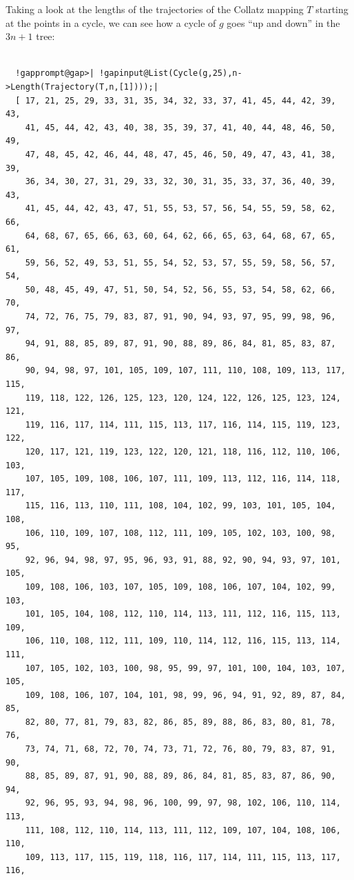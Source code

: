 \documentclass[a4paper,11pt]{report}
\begin{document}
{{\begin{Verbatim}[commandchars=!@A,fontsize=\small,frame=single,label=Example]
\end{Verbatim}
 Taking a look at the lengths of the trajectories of the Collatz mapping $T$ starting at the points in a cycle, we can see how a cycle of $g$ goes ``up and down'' in the $3n+1$ tree: 
\begin{Verbatim}[commandchars=!@|,fontsize=\small,frame=single,label=Example]
  
  !gapprompt@gap>| !gapinput@List(Cycle(g,25),n->Length(Trajectory(T,n,[1])));|
  [ 17, 21, 25, 29, 33, 31, 35, 34, 32, 33, 37, 41, 45, 44, 42, 39, 43, 
    41, 45, 44, 42, 43, 40, 38, 35, 39, 37, 41, 40, 44, 48, 46, 50, 49, 
    47, 48, 45, 42, 46, 44, 48, 47, 45, 46, 50, 49, 47, 43, 41, 38, 39, 
    36, 34, 30, 27, 31, 29, 33, 32, 30, 31, 35, 33, 37, 36, 40, 39, 43, 
    41, 45, 44, 42, 43, 47, 51, 55, 53, 57, 56, 54, 55, 59, 58, 62, 66, 
    64, 68, 67, 65, 66, 63, 60, 64, 62, 66, 65, 63, 64, 68, 67, 65, 61, 
    59, 56, 52, 49, 53, 51, 55, 54, 52, 53, 57, 55, 59, 58, 56, 57, 54, 
    50, 48, 45, 49, 47, 51, 50, 54, 52, 56, 55, 53, 54, 58, 62, 66, 70, 
    74, 72, 76, 75, 79, 83, 87, 91, 90, 94, 93, 97, 95, 99, 98, 96, 97, 
    94, 91, 88, 85, 89, 87, 91, 90, 88, 89, 86, 84, 81, 85, 83, 87, 86, 
    90, 94, 98, 97, 101, 105, 109, 107, 111, 110, 108, 109, 113, 117, 115, 
    119, 118, 122, 126, 125, 123, 120, 124, 122, 126, 125, 123, 124, 121, 
    119, 116, 117, 114, 111, 115, 113, 117, 116, 114, 115, 119, 123, 122, 
    120, 117, 121, 119, 123, 122, 120, 121, 118, 116, 112, 110, 106, 103, 
    107, 105, 109, 108, 106, 107, 111, 109, 113, 112, 116, 114, 118, 117, 
    115, 116, 113, 110, 111, 108, 104, 102, 99, 103, 101, 105, 104, 108, 
    106, 110, 109, 107, 108, 112, 111, 109, 105, 102, 103, 100, 98, 95, 
    92, 96, 94, 98, 97, 95, 96, 93, 91, 88, 92, 90, 94, 93, 97, 101, 105, 
    109, 108, 106, 103, 107, 105, 109, 108, 106, 107, 104, 102, 99, 103, 
    101, 105, 104, 108, 112, 110, 114, 113, 111, 112, 116, 115, 113, 109, 
    106, 110, 108, 112, 111, 109, 110, 114, 112, 116, 115, 113, 114, 111, 
    107, 105, 102, 103, 100, 98, 95, 99, 97, 101, 100, 104, 103, 107, 105, 
    109, 108, 106, 107, 104, 101, 98, 99, 96, 94, 91, 92, 89, 87, 84, 85, 
    82, 80, 77, 81, 79, 83, 82, 86, 85, 89, 88, 86, 83, 80, 81, 78, 76, 
    73, 74, 71, 68, 72, 70, 74, 73, 71, 72, 76, 80, 79, 83, 87, 91, 90, 
    88, 85, 89, 87, 91, 90, 88, 89, 86, 84, 81, 85, 83, 87, 86, 90, 94, 
    92, 96, 95, 93, 94, 98, 96, 100, 99, 97, 98, 102, 106, 110, 114, 113, 
    111, 108, 112, 110, 114, 113, 111, 112, 109, 107, 104, 108, 106, 110, 
    109, 113, 117, 115, 119, 118, 116, 117, 114, 111, 115, 113, 117, 116, 

\end{Verbatim}}}
\end{document}
